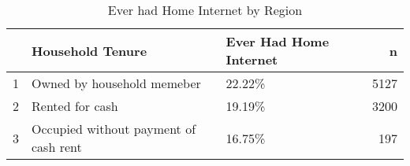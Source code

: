 \begin{table}[ht]
\centering
\begin{tabular}{rllr}
  \hline
 & Household Tenure & Ever Had Home Internet & n \\ 
  \hline
1 & Owned by household memeber & 22.22\% & 5127 \\ 
  2 & Rented for cash & 19.19\% & 3200 \\ 
  3 & Occupied without payment of cash rent & 16.75\% & 197 \\ 
   \hline
\end{tabular}
\caption{Ever had Home Internet by Region} 
\end{table}
